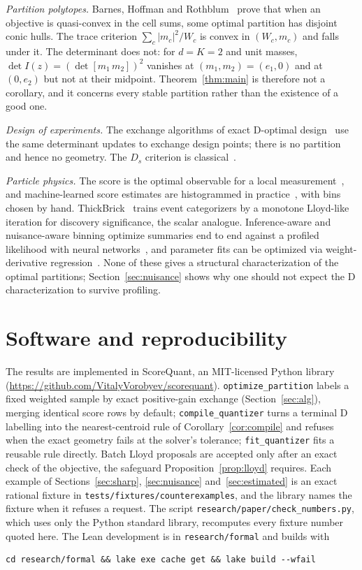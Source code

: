 \documentclass[11pt]{amsart}
\theoremstyle{definition}
\theoremstyle{remark}
\newcommand{\Ib}{I(z)}
\begin{document}
\emph{Partition polytopes.} Barnes, Hoffman and Rothblum~\cite{barnes1992} prove that when an
objective is quasi-convex in the cell sums, some optimal partition has disjoint conic hulls. The
trace criterion $\sum_c|m_c|^2/W_c$ is convex in $(W_c,m_c)$ and falls under it. The
determinant does not: for $d=K=2$ and unit masses, $\det\Ib=(\det[m_1\,m_2])^2$ vanishes at
$(m_1,m_2)=(e_1,0)$ and at $(0,e_2)$ but not at their midpoint. Theorem~\ref{thm:main} is
therefore not a corollary, and it concerns every stable partition rather than the existence of a
good one.

\emph{Design of experiments.} The exchange algorithms of exact D-optimal
design~\cite{fedorov1972,mitchell1974,cook1980} use the same determinant updates to exchange design
points; there is no partition and hence no geometry. The $D_s$ criterion is
classical~\cite{karlin1966}.

\emph{Particle physics.} The score is the optimal observable for a local
measurement~\cite{atwood1992,davier1993,diehl1994}, and machine-learned score estimates are
histogrammed in practice~\cite{brehmer2017,brehmer2018prl,brehmer2018prd,brehmer2020}, with bins
chosen by hand. ThickBrick~\cite{matchev2021} trains event categorizers by a monotone Lloyd-like
iteration for discovery significance, the scalar analogue. Inference-aware and nuisance-aware
binning optimize summaries end to end against a profiled likelihood with neural
networks~\cite{decastro2019,wunsch2021,simpson2023}, and parameter fits can be optimized via
weight-derivative regression~\cite{valassi2020}. None of these gives a structural
characterization of the optimal partitions; Section~\ref{sec:nuisance} shows why one should not
expect the D characterization to survive profiling.

\section{Software and reproducibility}\label{sec:software}

\sloppy
The results are implemented in ScoreQuant, an MIT-licensed Python library
(\url{https://github.com/VitalyVorobyev/scorequant}). \texttt{optimize\_partition} labels a fixed
weighted sample by exact positive-gain exchange (Section~\ref{sec:alg}), merging identical score
rows by default; \texttt{compile\_quantizer} turns a terminal D labelling into the
nearest-centroid rule of Corollary~\ref{cor:compile} and refuses when the exact geometry fails at
the solver's tolerance; \texttt{fit\_quantizer} fits a reusable rule directly. Batch Lloyd
proposals are accepted only after an exact check of the objective, the safeguard
Proposition~\ref{prop:lloyd} requires. Each example of Sections~\ref{sec:sharp},
\ref{sec:nuisance} and~\ref{sec:estimated} is an exact rational fixture in
\texttt{tests/fixtures/counterexamples}, and the library names the fixture when it refuses a
request. The script
\texttt{research/paper/check\_numbers.py}, which uses only the Python standard library,
recomputes every fixture number quoted here. The Lean development is in
\texttt{research/formal} and builds with
\begin{verbatim}
cd research/formal && lake exe cache get && lake build --wfail
\end{verbatim}



\end{document}
